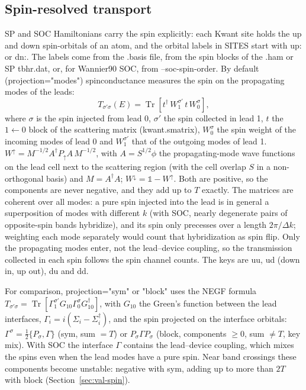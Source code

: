 \documentclass[11pt,a4paper]{article}
\newcommand{\code}[1]{{\ttfamily\def\_{\textunderscore\allowbreak}\def\slash{/\allowbreak}#1}}
\begin{document}
\subsection{Spin-resolved transport}\label{sec:spin}
SP and SOC Hamiltonians carry the spin explicitly: each Kwant site holds the up and down
spin-orbitals of an atom, and the orbital labels in \code{SITES} start with \code{up:} or
\code{dn:}. The labels come from the \code{.basis} file, from the spin blocks of the
\code{.ham} or SP \code{tb\_hr.dat}, or, for Wannier90 SOC, from \code{--soc-spin-order}.
By default (\code{projection="modes"}) \code{spin\_conductance} measures the spin on the
propagating modes of the leads:
\begin{equation}
  T_{\sigma'\sigma}(E) = \operatorname{Tr}\!\left[t^\dagger\, W_1^{\sigma'}\, t\, W_0^{\sigma}\right],
\end{equation}
where $\sigma$ is the spin injected from lead 0, $\sigma'$ the spin collected in lead 1, $t$
the $1\leftarrow0$ block of the scattering matrix (\code{kwant.smatrix}), $W_0^\sigma$ the
spin weight of the incoming modes of lead 0 and $W_1^{\sigma'}$ that of the outgoing modes of
lead 1. $W^\uparrow = M^{-1/2} A^\dagger P_\uparrow A\, M^{-1/2}$, with $A = S^{1/2}\phi$ the
propagating-mode wave functions on the lead cell next to the scattering region (with the
cell overlap $S$ in a non-orthogonal basis) and $M = A^\dagger A$;
$W^\downarrow = \mathbb{1} - W^\uparrow$. Both are positive, so the components are never
negative, and they add up to $T$ exactly. The matrices are coherent over all modes: a
pure spin injected into the lead is in general a superposition of modes with different
$k$ (with SOC, nearly degenerate pairs of opposite-spin bands hybridize), and its spin
only precesses over a length $2\pi/\Delta k$; weighting each mode separately would count
that hybridization as spin flip. Only the propagating modes
enter, not the lead--device coupling, so the transmission collected in each spin
follows the spin channel counts. The keys are \code{uu}, \code{ud} (down in, up out),
\code{du} and \code{dd}.

For comparison, \code{projection="sym"} or \code{"block"} uses the NEGF formula
$T_{\sigma'\sigma} = \operatorname{Tr}[\Gamma_1^{\sigma'} G_{10}\Gamma_0^{\sigma} G_{10}^\dagger]$,
with $G_{10}$ the Green's function between the lead interfaces, $\Gamma_i =
i(\Sigma_i-\Sigma_i^\dagger)$, and the spin projected on the interface orbitals:
$\Gamma^\sigma = \tfrac12\{P_\sigma,\Gamma\}$ (\code{sym}, sum $=T$) or
$P_\sigma\Gamma P_\sigma$ (\code{block}, components $\ge 0$, sum $\neq T$, key \code{mix}).
With SOC the interface $\Gamma$ contains the lead--device coupling, which mixes the spins
even when the lead modes have a pure spin. Near band crossings these components become
unstable: negative with \code{sym}, adding up to more than $2T$ with \code{block}
(Section~\ref{sec:val-spin}).
\end{document}
